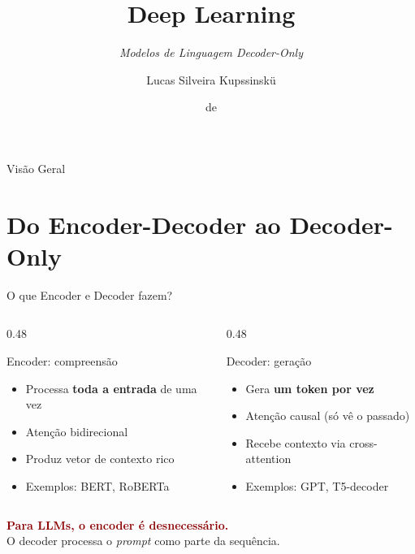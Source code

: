 \documentclass[aspectratio=169, xcolor=dvipsnames]{beamer}
\title{Deep Learning}
\subtitle{\textit{Modelos de Linguagem Decoder-Only}}
\author{Lucas Silveira Kupssinskü}
\institute
{ Machine Learning Theory and Applications Laboratory \\ PUCRS
}
\date{\mespor de \the\year}
\begin{document}
  \begin{frame}
    \titlepage
  \end{frame}

  \begin{frame}{Visão Geral}
    \tableofcontents
  \end{frame}

  \section{Do Encoder-Decoder ao Decoder-Only}

  \begin{frame}{O que Encoder e Decoder fazem?}
    \begin{columns}[T]
      \begin{column}{0.48\textwidth}
        \begin{block}{Encoder: compreensão}
          \begin{itemize}
            \item Processa \textbf{toda a entrada} de uma vez
            \item Atenção bidirecional
            \item Produz vetor de contexto rico
            \item Exemplos: BERT, RoBERTa
          \end{itemize}
        \end{block}
      \end{column}
      \begin{column}{0.48\textwidth}
        \begin{block}{Decoder: geração}
          \begin{itemize}
            \item Gera \textbf{um token por vez}
            \item Atenção causal (só vê o passado)
            \item Recebe contexto via cross-attention
            \item Exemplos: GPT, T5-decoder
          \end{itemize}
        \end{block}
      \end{column}
    \end{columns}
    \vspace{0.5em}
    \begin{center}
      \textcolor{DarkRed}{\textbf{Para LLMs, o encoder é desnecessário.}}\\
      \vspace{0.2em}
      O decoder processa o \textit{prompt} como parte da sequência.
    \end{center}
  \end{frame}
\end{document}

